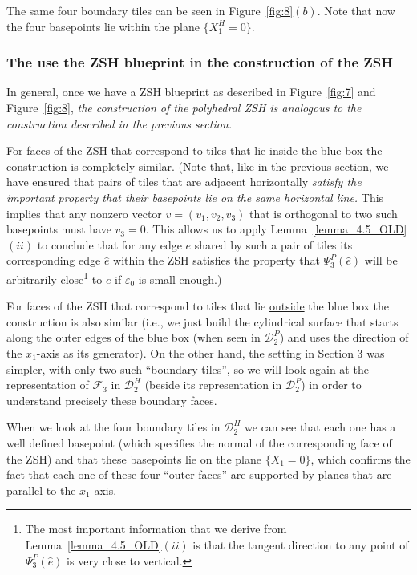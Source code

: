\documentclass[12pt,letterpaper]{article}
\newcommand{\eps}{\varepsilon}
\begin{document}
The same four boundary tiles can be seen in Figure~\ref{fig:8}$(b)$. Note that now  the four basepoints lie within the plane $\{ X_1^H = 0 \}$. 

\subsubsection{The use the ZSH blueprint in the construction of the ZSH}

In general, once we have a ZSH blueprint as described in Figure~\ref{fig:7} and Figure~\ref{fig:8}, {\em  the construction of the polyhedral ZSH is analogous to the construction described in the previous section.} 

For faces of the ZSH that correspond to tiles that lie \underline{inside} the blue box the construction is completely similar. (Note that, like in the previous section, we have ensured that pairs of tiles that are adjacent horizontally {\em satisfy the important property that their basepoints lie on the same horizontal line.} This implies that any nonzero vector $v=(v_1, v_2, v_3)$ that is orthogonal to two such basepoints must have $v_3 = 0$. This allows us to apply Lemma~\ref{lemma_4.5_OLD}$(ii)$ to conclude that for any edge $e$ shared by such a pair of tiles its corresponding edge $\hat e$ within the ZSH satisfies the property that $\Psi_3^P(\hat e)$ will be arbitrarily close\footnote{The most important information that we derive from Lemma~\ref{lemma_4.5_OLD}$(ii)$ is that the tangent direction to any point of $\Psi_3^P(\hat e)$ is very close to vertical.} to $e$ if $\eps_0$ is small enough.)

For faces of the ZSH that correspond to tiles that lie \underline{outside} the blue box the construction is also similar (i.e., we just build the cylindrical surface that starts along the outer edges of the blue box (when seen in $\mathscr{D}_2^P$) and uses the direction of the $x_1$-axis as its generator). On the other hand, the setting in Section 3 was simpler, with only two such ``boundary tiles'', so we will look again at the representation of $\mathcal{F}_3$ in $\mathscr{D}_2^H$ (beside its representation in $\mathscr{D}_2^P$) in order to understand precisely these boundary faces. 

When we look at the four boundary tiles in $\mathscr{D}_2^H$ we can see that each one has a well defined basepoint (which specifies the normal of the corresponding face of the ZSH) and that these basepoints lie on the plane $\{X_1=0\}$, which confirms the fact that each one of these four ``outer faces'' are supported by planes that are parallel to the $x_1$-axis.
\end{document}
